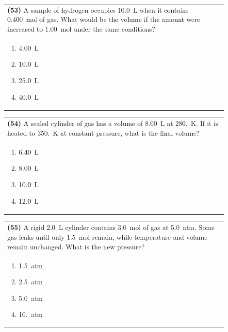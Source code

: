 \documentclass{article}
\begin{document}
\vspace{0.2cm}
\noindent\begin{tabular}{|p{0.9\linewidth}|}
\hline
\textbf{(53)} A sample of hydrogen occupies 10.0~L when it contains 0.400~mol of gas. What would be the volume if the amount were increased to 1.00~mol under the same conditions?\\[0.2cm]
\begin{minipage}[t]{0.85\linewidth}
\begin{enumerate}[label=\alph*.]
\item 4.00~L
\item 10.0~L
\item 25.0~L
\item 40.0~L
\end{enumerate}
\end{minipage}\\[0.2cm]
\hline
\end{tabular}

\vspace{0.2cm}
\noindent\begin{tabular}{|p{0.9\linewidth}|}
\hline
\textbf{(54)} A sealed cylinder of gas has a volume of 8.00~L at 280.~K. If it is heated to 350.~K at constant pressure, what is the final volume?\\[0.2cm]
\begin{minipage}[t]{0.85\linewidth}
\begin{enumerate}[label=\alph*.]
\item 6.40~L
\item 8.00~L
\item 10.0~L
\item 12.0~L
\end{enumerate}
\end{minipage}\\[0.2cm]
\hline
\end{tabular}

\vspace{0.2cm}
\noindent\begin{tabular}{|p{0.9\linewidth}|}
\hline
\textbf{(55)} A rigid 2.0~L cylinder contains 3.0~mol of gas at 5.0~atm. Some gas leaks until only 1.5~mol remain, while temperature and volume remain unchanged. What is the new pressure?\\[0.2cm]
\begin{minipage}[t]{0.85\linewidth}
\begin{enumerate}[label=\alph*.]
\item 1.5~atm
\item 2.5~atm
\item 5.0~atm
\item 10.~atm
\end{enumerate}
\end{minipage}\\[0.2cm]
\hline
\end{tabular}
\end{document}
